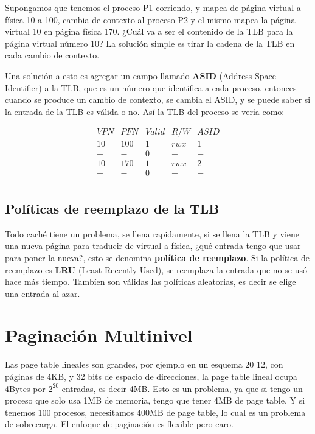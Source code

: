 \documentclass{article}
\begin{document}
Supongamos que tenemos el proceso P1 corriendo, y mapea de página virtual a física 10 a 100, cambia de contexto al proceso P2 y el mismo mapea la página virtual 10 en página física 170. ¿Cuál va a ser el contenido de la TLB para la página virtual número 10? La solución simple es tirar la cadena de la TLB en cada cambio de contexto. 

Una solución a esto es agregar un campo llamado \textbf{ASID} (Address Space Identifier) a la TLB, que es un número que identifica a cada proceso, entonces cuando se produce un cambio de contexto, se cambia el ASID, y se puede saber si la entrada de la TLB es válida o no. Así la TLB del proceso se vería como:

\begin{equation*}
    \begin{array}{c|c|c|c|c}
        VPN & PFN & Valid & R/W & ASID \\
        \hline
        10 & 100 & 1 & rwx & 1 \\
        - & - & 0 & - & - \\
        \hline
        10 & 170 & 1 & rwx & 2 \\
        - & - & 0 & - & - \\
    \end{array}
\end{equation*}

\subsection{Políticas de reemplazo de la TLB}
Todo caché tiene un problema, se llena rapidamente, si se llena la TLB y viene una nueva página para traducir de virtual a física, ¿qué entrada tengo que usar para poner la nueva?, esto se denomina \textbf{política de reemplazo}. Si la política de reemplazo es \textbf{LRU} (Least Recently Used), se reemplaza la entrada que no se usó hace más tiempo. Tambíen son válidas las políticas aleatorias, es decir se elige una entrada al azar.

\section{Paginación Multinivel}
Las page table lineales son grandes, por ejemplo en un esquema 20 12, con páginas de 4KB, y 32 bits de espacio de direcciones, la page table lineal ocupa 4Bytes por $2^{20}$ entradas, es decir 4MB. Esto es un problema, ya que si tengo un proceso que solo usa 1MB de memoria, tengo que tener 4MB de page table. Y si tenemos 100 procesos, necesitamos 400MB de page table, lo cual es un problema de sobrecarga. El enfoque de paginación es flexible pero caro.
\end{document}
